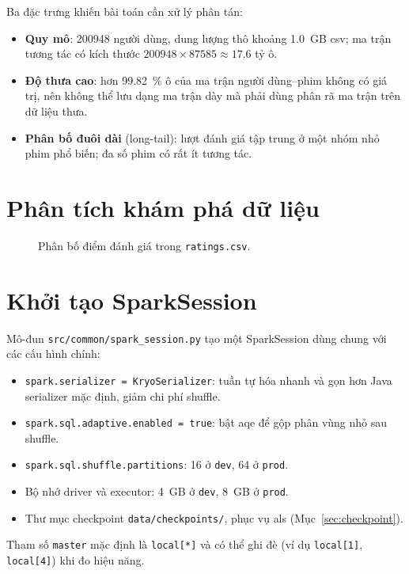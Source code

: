 Ba đặc trưng khiến bài toán cần xử lý phân tán:
\begin{itemize}
    \item \textbf{Quy mô}: \num{200948} người dùng, dung lượng thô khoảng \SI{1,0}{GB} \gls{csv}; ma trận tương tác có kích thước $\num{200948} \times \num{87585} \approx \num{17,6}$ tỷ ô.
    \item \textbf{Độ thưa cao}: hơn \SI{99,82}{\percent} ô của ma trận người dùng--phim không có giá trị, nên không thể lưu dạng ma trận dày mà phải dùng phân rã ma trận trên dữ liệu thưa.
    \item \textbf{Phân bố đuôi dài} (long-tail): lượt đánh giá tập trung ở một nhóm nhỏ phim phổ biến; đa số phim có rất ít tương tác.
\end{itemize}

\section{Phân tích khám phá dữ liệu}
\label{sec:eda}

\begin{figure}[H]
\centering
{}
\vspace{5mm}
\caption[Phân bố điểm đánh giá]{Phân bố điểm đánh giá trong \texttt{ratings.csv}. }
\label{fig:eda_rating}
\end{figure}

\section{Khởi tạo SparkSession}
\label{sec:spark_session}
Mô-đun \texttt{src/common/spark\_session.py} tạo một SparkSession dùng chung với các cấu hình chính:
\begin{itemize}
    \item \texttt{spark.serializer = KryoSerializer}: tuần tự hóa nhanh và gọn hơn Java serializer mặc định, giảm chi phí shuffle.
    \item \texttt{spark.sql.adaptive.enabled = true}: bật \gls{aqe} để gộp phân vùng nhỏ sau shuffle.
    \item \texttt{spark.sql.shuffle.partitions}: \num{16} ở \texttt{dev}, \num{64} ở \texttt{prod}.
    \item Bộ nhớ driver và executor: \SI{4}{GB} ở \texttt{dev}, \SI{8}{GB} ở \texttt{prod}.
    \item Thư mục checkpoint \texttt{data/checkpoints/}, phục vụ \gls{als} (Mục~\ref{sec:checkpoint}).
\end{itemize}
Tham số \texttt{master} mặc định là \texttt{local[*]} và có thể ghi đè (ví dụ \texttt{local[1]}, \texttt{local[4]}) khi đo hiệu năng.

